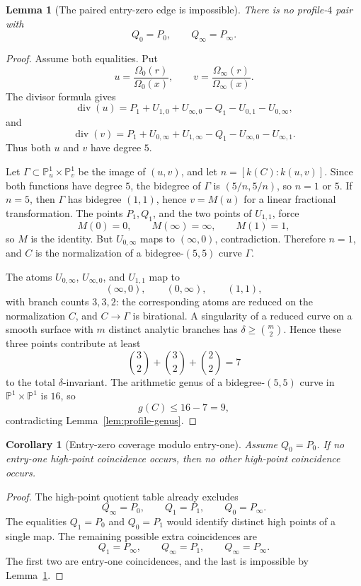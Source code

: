 \documentclass[11pt]{amsart}
\newtheorem{lemma}[theorem]{Lemma}
\newtheorem{corollary}[theorem]{Corollary}
\newcommand{\PP}{\mathbb P}
\newcommand{\Div}{\operatorname{div}}
\begin{document}
\begin{lemma}[The paired entry-zero edge is impossible]
\label{lem:paired-edge}
There is no profile-\(4\) pair with
\[
  Q_0=P_0,\qquad Q_\infty=P_\infty.
\]
\end{lemma}

\begin{proof}
Assume both equalities.  Put
\[
  u=\frac{\Omega_0(r)}{\Omega_0(x)},\qquad
  v=\frac{\Omega_\infty(r)}{\Omega_\infty(x)}.
\]
The divisor formula gives
\[
  \Div(u)=P_1+U_{1,0}+U_{\infty,0}
          -Q_1-U_{0,1}-U_{0,\infty},
\]
and
\[
  \Div(v)=P_1+U_{0,\infty}+U_{1,\infty}
          -Q_1-U_{\infty,0}-U_{\infty,1}.
\]
Thus both \(u\) and \(v\) have degree \(5\).

Let \(\Gamma\subset\PP^1_u\times\PP^1_v\) be the image of
\((u,v)\), and let \(n=[k(C):k(u,v)]\).  Since both functions have degree
\(5\), the bidegree of \(\Gamma\) is \((5/n,5/n)\), so \(n=1\) or \(5\).
If \(n=5\), then \(\Gamma\) has bidegree \((1,1)\), hence
\(v=M(u)\) for a linear fractional transformation.  The points \(P_1,Q_1\), and the two
points of \(U_{1,1}\), force
\[
  M(0)=0,\qquad M(\infty)=\infty,\qquad M(1)=1,
\]
so \(M\) is the identity.  But \(U_{0,\infty}\) maps to
\((\infty,0)\), contradiction.  Therefore \(n=1\), and \(C\) is the
normalization of a bidegree-\((5,5)\) curve \(\Gamma\).

The atoms \(U_{0,\infty}\), \(U_{\infty,0}\), and \(U_{1,1}\) map to
\[
  (\infty,0),\qquad (0,\infty),\qquad (1,1),
\]
with branch counts \(3,3,2\): the corresponding atoms are reduced on the
normalization \(C\), and \(C\to\Gamma\) is birational.  A singularity of a
reduced curve on a smooth surface with \(m\) distinct analytic branches has
\(\delta\ge {m\choose 2}\).  Hence these three points contribute at least
\[
  {3\choose2}+{3\choose2}+{2\choose2}=7
\]
to the total \(\delta\)-invariant.  The arithmetic genus of a
bidegree-\((5,5)\) curve in \(\PP^1\times\PP^1\) is \(16\), so
\[
  g(C)\le 16-7=9,
\]
contradicting Lemma~\ref{lem:profile-genus}.
\end{proof}

\begin{corollary}[Entry-zero coverage modulo entry-one]
\label{cor:entry0-coverage}
Assume \(Q_0=P_0\).  If no entry-one high-point coincidence occurs, then no
other high-point coincidence occurs.
\end{corollary}

\begin{proof}
The high-point quotient table already excludes
\[
  Q_\infty=P_0,\qquad Q_1=P_1,\qquad Q_0=P_\infty.
\]
The equalities \(Q_1=P_0\) and \(Q_0=P_1\) would identify distinct high points
of a single map.  The remaining possible extra coincidences are
\[
  Q_1=P_\infty,\qquad Q_\infty=P_1,\qquad Q_\infty=P_\infty.
\]
The first two are entry-one coincidences, and the last is impossible by
Lemma~\ref{lem:paired-edge}.
\end{proof}
\end{document}
